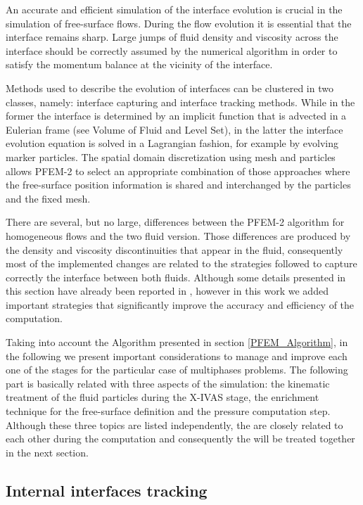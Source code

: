 An accurate and efficient simulation of the interface evolution is crucial in the simulation of free-surface flows. During the flow evolution it is essential that the interface remains sharp. Large jumps of fluid density and viscosity across the interface should be correctly assumed by the numerical algorithm in order to satisfy the momentum balance at the vicinity of the interface.

Methods used to describe the evolution of interfaces can be clustered in two classes, namely: interface capturing and interface tracking methods. While in the former the interface is determined by an implicit function that is advected in a Eulerian frame (see Volume of Fluid \cite{VoF} and Level Set\cite{Osher01}), in the latter the interface evolution equation is solved in a Lagrangian fashion, for example by evolving marker particles. The spatial domain discretization using mesh and particles allows PFEM-2 to select an appropriate combination of those approaches where the free-surface position information is shared and interchanged by the particles and the fixed mesh.

There are several, but no large, differences between the PFEM-2 algorithm for homogeneous flows and the two fluid version. Those differences are produced by the density and viscosity discontinuities that appear in the fluid, consequently most of the implemented changes are related to the strategies followed to capture correctly the interface between both fluids. Although some details presented in this section have already been reported in \cite{Idelsohn13c}, however in this work we added important strategies that significantly improve the accuracy and efficiency of the computation.

Taking into account the Algorithm presented in section \ref{PFEM_Algorithm}, in the following we present important considerations to manage and improve each one of the stages for the particular case of multiphases problems. The following part is basically related with three aspects of the simulation: the kinematic treatment of the fluid particles during the X-IVAS stage, the enrichment technique for the free-surface definition and the pressure computation step. Although these three topics are listed independently, the are closely related to each other during the computation and consequently the will be treated together in the next section.

\subsection{Internal interfaces tracking}

